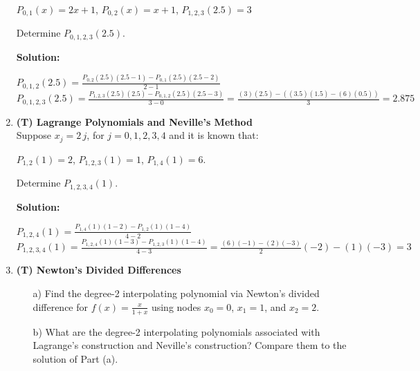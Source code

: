 \documentclass[12pt]{article}
\begin{document}
\begin{enumerate}[label=\bfseries Problem \arabic*:]
\begin{center} 
$P_{0,1}(x)=2x+1$, $P_{0,2}(x)=x+1$, $P_{1,2,3}(2.5)=3$ 
\end{center}
Determine $P_{0,1,2,3}(2.5)$.


\vspace{1em}
\textbf{Solution:}\par
$P_{0,1,2}(2.5)=\frac{P_{0,2}(2.5)(2.5-1)-P_{0,1}(2.5)(2.5-2)}{2-1}$\\
$P_{0,1,2,3}(2.5)=\frac{P_{1,2,3}(2.5)(2.5)-P_{0,1,2}(2.5)(2.5-3)}{3-0}=\frac{(3)(2.5)-((3.5)(1.5)-(6)(0.5))}{3}=2.875$
\newpage
\item \textbf{(T) Lagrange Polynomials and Neville's Method}\\
Suppose $x_j=2\,j$, for $j=0, 1, 2, 3, 4$  and it is known that:

\begin{center} 
$P_{1,2}(1)=2$, \hspace{1em} $P_{1,2,3}(1)=1$,\hspace{1em}  $P_{1,4}(1)=6$.
\end{center}
Determine $P_{1,2,3,4}(1)$.

\vspace{1em}
\textbf{Solution:}\par
$P_{1,2,4}(1)=\frac{P_{1,4}(1)(1-2)-P_{1,2}(1)(1-4)}{4-2}$\\
$P_{1,2,3,4}(1)=\frac{P_{1,2,4}(1)(1-3)-P_{1,2,3}(1)(1-4)}{4-3}=\frac{(6)(-1)-(2)(-3)}{2}(-2)-(1)(-3)=3$
\newpage

 \item \textbf{(T) Newton's Divided Differences}
 \begin{itemize}
\item[a)] Find the degree-2 interpolating polynomial via Newton's divided difference for $f(x)  = \frac{x}{1+x}$ using nodes $x_0=0$, $x_1=1$, and $x_2=2$.
\item[b)] What are the degree-2 interpolating polynomials associated with Lagrange's construction and Neville's construction? Compare them to the solution of Part (a).
 \end{itemize}
 




\end{enumerate}
\end{document}
